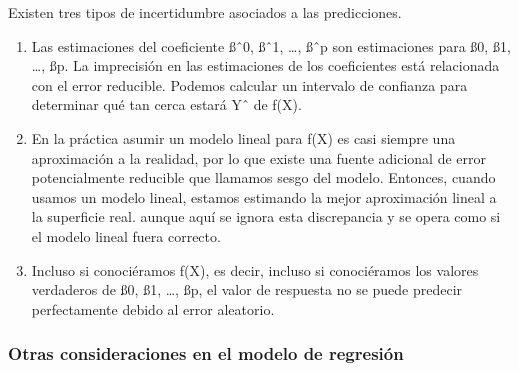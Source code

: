 \documentclass[
  letterpaper,
  DIV=11,
  numbers=noendperiod]{scrartcl}
\providecommand{\tightlist}{%
  \setlength{\itemsep}{0pt}\setlength{\parskip}{0pt}}\usepackage{longtable,booktabs,array}
\begin{document}
Existen tres tipos de incertidumbre asociados a las predicciones.

\begin{enumerate}
\def\labelenumi{\arabic{enumi}.}
\tightlist
\item
  Las estimaciones del coeficiente ßˆ0, ßˆ1, \ldots, ßˆp son
  estimaciones para ß0, ß1, \ldots, ßp. La imprecisión en las
  estimaciones de los coeficientes está relacionada con el error
  reducible. Podemos calcular un intervalo de confianza para determinar
  qué tan cerca estará Yˆ de f(X).
\item
  En la práctica asumir un modelo lineal para f(X) es casi siempre una
  aproximación a la realidad, por lo que existe una fuente adicional de
  error potencialmente reducible que llamamos sesgo del modelo.
  Entonces, cuando usamos un modelo lineal, estamos estimando la mejor
  aproximación lineal a la superficie real. aunque aquí se ignora esta
  discrepancia y se opera como si el modelo lineal fuera correcto.
\item
  Incluso si conociéramos f(X), es decir, incluso si conociéramos los
  valores verdaderos de ß0, ß1, \ldots, ßp, el valor de respuesta no se
  puede predecir perfectamente debido al error aleatorio.
\end{enumerate}

\hypertarget{otras-consideraciones-en-el-modelo-de-regresiuxf3n}{%
\subsubsection{\texorpdfstring{\textbf{Otras consideraciones en el
modelo de
regresión}}{Otras consideraciones en el modelo de regresión}}\label{otras-consideraciones-en-el-modelo-de-regresiuxf3n}}
\end{document}
